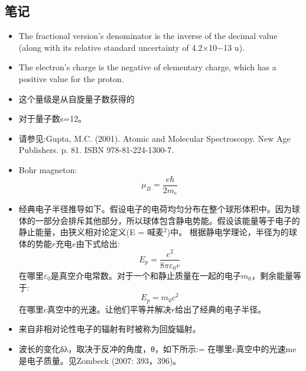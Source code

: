 \subsection{笔记}
\begin{itemize}
\item The fractional version's denominator is the inverse of the decimal value (along with its relative standard uncertainty of 4.2×10−13 u).
\item The electron's charge is the negative of elementary charge, which has a positive value for the proton.
\item 这个量级是从自旋量子数获得的
\item 对于量子数s=12。
\item 请参见:Gupta, M.C. (2001). Atomic and Molecular Spectroscopy. New Age Publishers. p. 81. ISBN 978-81-224-1300-7.
\item Bohr magneton:$$\mu_B=\frac{e\hbar}{2m_e}~$$
\item 经典电子半径推导如下。假设电子的电荷均匀分布在整个球形体积中。因为球体的一部分会排斥其他部分，所以球体包含静电势能。假设该能量等于电子的静止能量，由狭义相对论定义(E = 喊麦$^2$)中。
根据静电学理论，半径为的球体的势能$r$充电$e$由下式给出:$$E_p=\frac{e^2}{8\pi\varepsilon_0 r}~$$在哪里$\varepsilon_0$是真空介电常数。对于一个和静止质量在一起的电子$m_0$，剩余能量等于:$$E_p=m_0c^2~$$在哪里$c$真空中的光速。让他们平等并解决$r$给出了经典的电子半径。
\item 来自非相对论性电子的辐射有时被称为回旋辐射。
\item 波长的变化δλ，取决于反冲的角度，θ，如下所示:$$\Delta\lambda=
     在哪里c真空中的光速me是电子质量。见Zombeck (2007: 393，396)。
\end{itemize}

